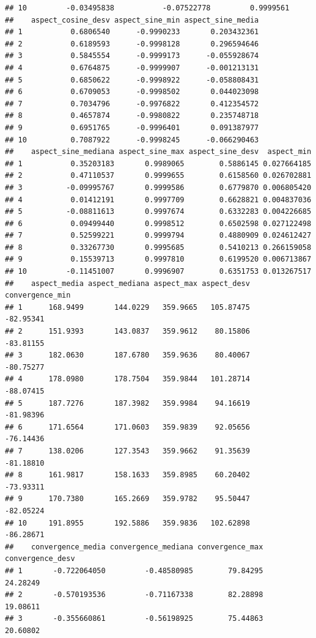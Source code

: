 \documentclass[11pt,]{article}
\begin{document}
\begin{verbatim}
## 10         -0.03495838           -0.07522778         0.9999561
##    aspect_cosine_desv aspect_sine_min aspect_sine_media
## 1           0.6806540      -0.9990233       0.203432361
## 2           0.6189593      -0.9998128       0.296594646
## 3           0.5845554      -0.9999173      -0.055928674
## 4           0.6764875      -0.9999907      -0.001213131
## 5           0.6850622      -0.9998922      -0.058808431
## 6           0.6709053      -0.9998502       0.044023098
## 7           0.7034796      -0.9976822       0.412354572
## 8           0.4657874      -0.9980822       0.235748718
## 9           0.6951765      -0.9996401       0.091387977
## 10          0.7087922      -0.9998245      -0.066290463
##    aspect_sine_mediana aspect_sine_max aspect_sine_desv  aspect_min
## 1           0.35203183       0.9989065        0.5886145 0.027664185
## 2           0.47110537       0.9999655        0.6158560 0.026702881
## 3          -0.09995767       0.9999586        0.6779870 0.006805420
## 4           0.01412191       0.9997709        0.6628821 0.004837036
## 5          -0.08811613       0.9997674        0.6332283 0.004226685
## 6           0.09499440       0.9998512        0.6502598 0.027122498
## 7           0.52599221       0.9999794        0.4880909 0.024612427
## 8           0.33267730       0.9995685        0.5410213 0.266159058
## 9           0.15539713       0.9997810        0.6199520 0.006713867
## 10         -0.11451007       0.9996907        0.6351753 0.013267517
##    aspect_media aspect_mediana aspect_max aspect_desv convergence_min
## 1      168.9499       144.0229   359.9665   105.87475       -82.95341
## 2      151.9393       143.0837   359.9612    80.15806       -83.81155
## 3      182.0630       187.6780   359.9636    80.40067       -80.75277
## 4      178.0980       178.7504   359.9844   101.28714       -88.07415
## 5      187.7276       187.3982   359.9984    94.16619       -81.98396
## 6      171.6564       171.0603   359.9839    92.05656       -76.14436
## 7      138.0206       127.3543   359.9662    91.35639       -81.18810
## 8      161.9817       158.1633   359.8985    60.20402       -73.93311
## 9      170.7380       165.2669   359.9782    95.50447       -82.05224
## 10     191.8955       192.5886   359.9836   102.62898       -86.28671
##    convergence_media convergence_mediana convergence_max convergence_desv
## 1       -0.722064050         -0.48580985        79.84295         24.28249
## 2       -0.570193536         -0.71167338        82.28898         19.08611
## 3       -0.355660861         -0.56198925        75.44863         20.60802

\end{verbatim}
\end{document}
